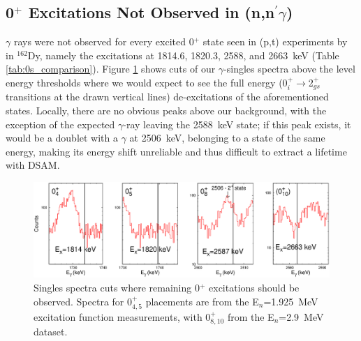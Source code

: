 \subsection{0$^+$ Excitations Not Observed in (n,n$^\prime\gamma$)}
$\gamma$ rays were not observed for every excited 0$^+$ state seen in (p,t) experiments by \cite{Meyer_pt0_2006} in $^{162}$Dy, namely the excitations at 1814.6, 1820.3, 2588, and 2663~keV (Table \ref{tab:0s_comparison}). Figure \ref{fig:162Dy_unobserved_0s} shows cuts of our $\gamma$-singles spectra above the level energy thresholds where we would expect to see the full energy (0$^+_i\rightarrow$2$^+_{gs}$ transitions at the drawn vertical lines) de-excitations of the aforementioned states. Locally, there are no obvious peaks above our background, with the exception of the expected $\gamma$-ray leaving the 2588~keV state; if this peak exists, it would be a doublet with a $\gamma$ at 2506~keV, belonging to a state of the same energy, making its energy shift unreliable and thus difficult to extract a lifetime with DSAM. 

\begin{figure}[t]
\begin{center}
\includegraphics[width=0.999\textwidth]{figures/162Dy_unobserved_0s.eps}
\caption{Singles spectra cuts where remaining 0$^+$ excitations should be observed. Spectra for 0$^+_{4,5}$ placements are from the E$_n$=1.925~MeV excitation function measurements, with 0$^+_{8,10}$ from the E$_n$=2.9~MeV dataset.  \label{fig:162Dy_unobserved_0s}}
\end{center}
\end{figure}

